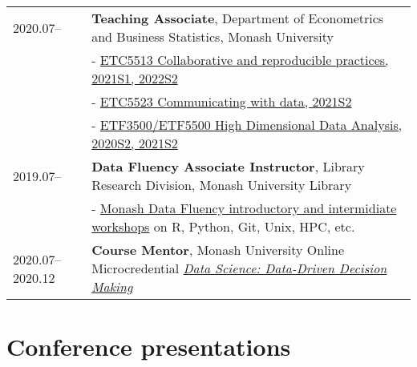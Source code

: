 \documentclass[10pt,a4paper,]{article}
\begin{document}
\begin{tabular}{ll}
  2020.07-- & \textbf{Teaching Associate}, Department of Econometrics and Business Statistics, Monash University \\ 
   & - \href{https://handbook.monash.edu/2021/units/ETC5513?year=2021}{ETC5513 Collaborative and reproducible practices, 2021S1, 2022S2} \\ 
   & - \href{https://handbook.monash.edu/2021/units/ETC5523?year=2021}{ETC5523 Communicating with data, 2021S2} \\ 
   & - \href{https://handbook.monash.edu/2020/units/ETF5500?year=2020}{ETF3500/ETF5500 High Dimensional Data Analysis, 2020S2, 2021S2} \\ 
  2019.07-- & \textbf{Data Fluency Associate Instructor}, Library Research Division, Monash University Library \\ 
   & - \href{https://www.monash.edu/data-fluency/home}{Monash Data Fluency introductory and intermidiate workshops} on R, Python, Git, Unix, HPC, etc. \\ 
  2020.07--2020.12 & \textbf{Course Mentor}, Monash University Online Microcredential \href{https://www.futurelearn.com/microcredentials/data-driven-decision-making?utm_source=faculty_website&utm_medium=monash_organic_referrer&utm_campaign=mc_jan}{\textit{Data Science: Data-Driven Decision Making}} \\ 
  \end{tabular}

\hypertarget{conference-presentations}{%
\section{Conference presentations}\label{conference-presentations}}
\end{document}
